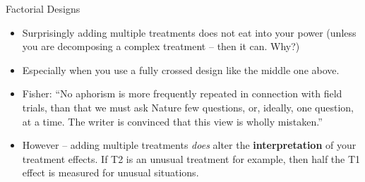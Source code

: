 \documentclass[
  11pt,
  ignorenonframetext,
]{beamer}
\providecommand{\tightlist}{%
  \setlength{\itemsep}{0pt}\setlength{\parskip}{0pt}}\usepackage{longtable,booktabs,array}
\begin{document}
\begin{frame}{Factorial Designs}
\protect\hypertarget{factorial-designs-3}{}
\begin{itemize}
\tightlist
\item
  Surprisingly adding multiple treatments does not eat into your power
  (unless you are decomposing a complex treatment -- then it can. Why?)
\item
  Especially when you use a fully crossed design like the middle one
  above.
\item
  Fisher: ``No aphorism is more frequently repeated in connection with
  field trials, than that we must ask Nature few questions, or, ideally,
  one question, at a time. The writer is convinced that this view is
  wholly mistaken.''
\item
  However -- adding multiple treatments \textit{does} alter the
  \textbf{interpretation} of your treatment effects. If T2 is an unusual
  treatment for example, then half the T1 effect is measured for unusual
  situations.
\end{itemize}
\end{frame}
\end{document}
